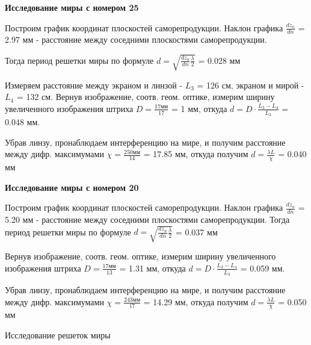 \documentclass[15pt,a5paper,reqno]{article}
\begin{document}
\textbf{Исследование миры с номером 25}

Построим график координат плоскостей саморепродукции. Наклон графика $\frac{dz_n}{dn}$ = 2.97 мм - расстояние между соседними плоскостями саморепродукции. 

Тогда период решетки миры по формуле $d = \sqrt{\frac{dz_n}{dn}\frac{\lambda}{2}}$ = 0.028 мм

Измеряем расстояние между экраном и линзой - $L_3$ = 126 см, экраном и мирой - $L_4$ = 132 см.
Вернув изображение, соотв. геом. оптике, измерим ширину увеличенного изображения штриха $D = \frac{17 мм}{17}$ = 1 мм, откуда $d = D\cdot \frac{L_3 - L_4}{L_3}$ = 0.048 мм.

Убрав линзу, пронаблюдаем интерференцию на мире, и получим расстояние между дифр. максимумами $\chi = \frac{250 мм}{14}$ = 17.85 мм, откуда получим $d = \frac{\lambda L}{\chi}$ = 0.040 мм

\textbf{Исследование миры с номером 20}

Построим график координат плоскостей саморепродукции. Наклон графика $\frac{dz_n}{dn}$ = 5.20 мм - расстояние между соседними плоскостями саморепродукции. Тогда период решетки миры по формуле $d = \sqrt{\frac{dz_n}{dn}\frac{\lambda}{2}}$ = 0.037 мм


Вернув изображение, соотв. геом. оптике, измерим ширину увеличенного изображения штриха $D = \frac{17 мм}{13}$ = 1.31 мм, откуда $d = D\cdot \frac{L_3 - L_4}{L_3}$ = 0.059 мм.

Убрав линзу, пронаблюдаем интерференцию на мире, и получим расстояние между дифр. максимумами $\chi = \frac{243 мм}{17}$ = 14.29 мм, откуда получим $d = \frac{\lambda L}{\chi}$ = 0.050 мм

\begin{table}[h!]
	\centering
	
	\caption{Исследование решеток миры}
	\label{nu1}
\end{table}
\end{document}
